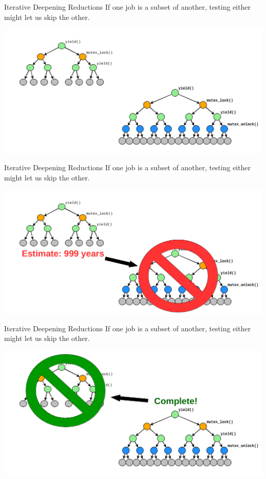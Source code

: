 \documentclass[xcolor=dvipsnames]{beamer}
\begin{document}
\begin{frame}{Iterative Deepening Reductions}
	If one job is a subset of another, testing either might let us skip the other.
	\begin{center}
		\includegraphics[width=\textwidth]{reduction-nothing.png}
	\end{center}
\end{frame}
\begin{frame}{Iterative Deepening Reductions}
	If one job is a subset of another, testing either might let us skip the other.
	\begin{center}
		\includegraphics[width=\textwidth]{reduction-deferred.png}
	\end{center}
\end{frame}
\begin{frame}{Iterative Deepening Reductions}
	If one job is a subset of another, testing either might let us skip the other.
	\begin{center}
		\includegraphics[width=\textwidth]{reduction-complete.png}
	\end{center}
\end{frame}
\end{document}
